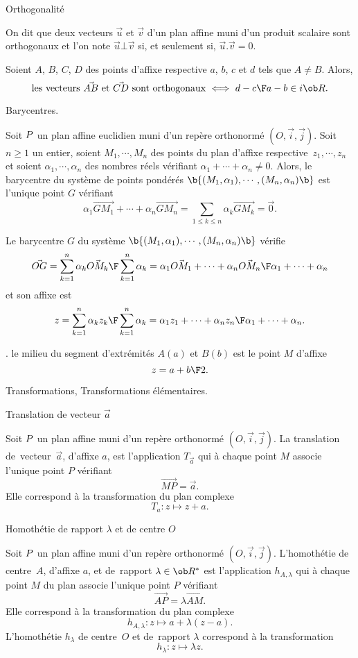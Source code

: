 \Concept [] Orthogonalité 


\Definition [] On dit que deux vecteurs $\vec u$ et $\vec v$ d'un plan affine muni d'un produit scalaire sont orthogonaux et l'on note {$\vec u\bot\vec v$ si, et seulement si, $\vec u.\vec v=0$}. 
\bigskip

\noindent
Soient $A$, $B$, $C$, $D$ des points d'affixe respective $a$, $b$, $c$ et $d$ tels que $A\neq B$. Alors, 
$$
{\mbox{les vecteurs $\vec{AB}$ et $\vec{CD}$ sont orthogonaux}\ \Longleftrightarrow\ {d-c\F a-b}\in i\ob R}. 
$$

\Concept [] Barycentres.

\Definition [] Soit $\sc P$ un plan affine euclidien muni d'un repère orthonormé $(O,\vec i,\vec j)$. \pn Soit $n\ge1$ un entier, soient $M_1,\cdots,M_n$ des points du plan d'affixe respective~$z_1,\cdots,z_n$ 
et soient $\alpha_1,\cdots,\alpha_n$ des nombres réels vérifiant {$\alpha_1+\cdots+\alpha_n\neq0$}. 
Alors, le {barycentre} du système de points pondérés {$\b\{(M_1,\alpha_1),\cdots,(M_n,\alpha_n)\b\}$} est l'unique point $G$ vérifiant 
$$
\alpha_1\vec{GM_1}+\cdots+\alpha_n\vec{GM_n}={\sum_{1\le k\le n}\alpha_k\vec{GM_k}=\vec0}.
$$


\Propriete [] Le barycentre $G$ du système $\b\{(M_1,\alpha_1),\cdots,(M_n,\alpha_n)\b\}$ vérifie 
$$
{\vec{OG}={\sum_{k=1}^n\alpha_k\vec{OM_k}\F\sum_{k=1}^n\alpha_k}}={\alpha_1\vec{OM_1}+\cdots+\alpha_n\vec{OM_n}\F\alpha_1+\cdots+\alpha_n}
$$
et son affixe est 
$$
{z={\sum_{k=1}^n\alpha_kz_k\F\sum_{k=1}^n\alpha_k}}={\alpha_1z_1+\cdots+\alpha_nz_n\F\alpha_1+\cdots+\alpha_n}.
$$

\Exemple. le {milieu} du segment d'extrémités $A(a)$ et $B(b)$ est le point $M$ d'affixe 
$$
{z={a+b\F2}}.
$$

\Subsection Transformations, Transformations élémentaires.

\Concept [] Translation de vecteur $\vec a$ 

\noindent
Soit $\sc P$ un plan affine muni d'un repère orthonormé $(O,\vec i,\vec j)$. 
La translation de~vecteur~$\vec a$, d'affixe $a$, est l'application $T_{\vec a}$ qui à chaque point $M$ associe l'unique point $P$ vérifiant 
$$
\vec{MP}=\vec a.
$$
Elle correspond à la transformation du plan complexe 
$${T_a:z\mapsto z+a}. 
$$ 

\Concept [] Homothétie de rapport $\lambda$ et de centre $O$

\noindent
Soit $\sc P$ un plan affine muni d'un repère orthonormé $(O,\vec i,\vec j)$. 
L'homothétie de centre~$A$, d'affixe $a$, et de~rapport $\lambda\in\ob R^*$ est l'application $h_{A,\lambda}$ qui à chaque point $M$ du plan associe l'unique point $P$ vérifiant 
$$
\vec{AP}=\lambda\vec{AM}.
$$
Elle correspond à la transformation du plan complexe 
$$
h_{A,\lambda}:z\mapsto a+\lambda(z-a).
$$
L'homothétie $h_\lambda$ de centre~$O$ et de~rapport $\lambda$ correspond à la transformation 
$$
{h_\lambda:z\mapsto \lambda z}. 
$$ 

